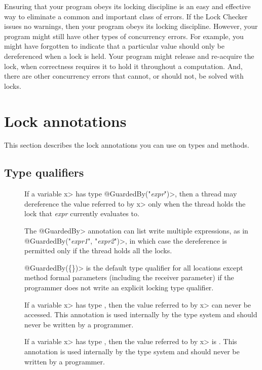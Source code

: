 Ensuring that your program obeys its locking discipline is an easy and
effective way to eliminate a common and important class of errors.
If the Lock Checker issues no warnings, then your program obeys its locking discipline.
However, your program might still have other types of concurrency errors.
For example, you might have forgotten to indicate that a particular value
should only be dereferenced when a lock is held.  Your program might release and
re-acquire the lock, when correctness requires it to hold it throughout a
computation.  And, there are other concurrency errors that cannot, or
should not, be solved with locks.


\section{Lock annotations\label{lock-annotations}}

This section describes the lock annotations you can use on types and methods.


\subsection{Type qualifiers\label{lock-type-qualifiers}}

\begin{description}

\item[]
  If a variable \<x> has type \<@GuardedBy("\emph{expr}")>, then a thread may
  dereference the value referred to by \<x> only when the thread holds the
  lock that \emph{expr} currently evaluates to.

  The \<@GuardedBy> annotation can list write multiple expressions, as in
  \<@GuardedBy(\ttlcb"\emph{expr1}", "\emph{expr2}"\ttrcb)>, in which case
  the dereference is
  permitted only if the thread holds all the locks.

  \<@GuardedBy(\{\})> is the default type qualifier for all locations
  except method formal parameters (including the receiver parameter)
  if the programmer does not
  write an explicit locking type qualifier.

\item[]
  If a variable \<x> has type , then
  the value referred to by \<x> can never be accessed.
  This annotation is used internally by the type system
  and should never be written by a programmer.

\item[]
  If a variable \<x> has type , then
  the value referred to by \<x> is .
  This annotation is used internally by the type system
  and should never be written by a programmer.

\end{description}

